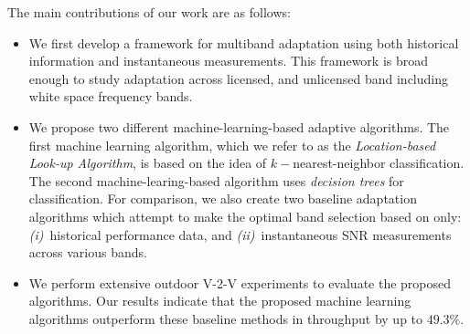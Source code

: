 The main contributions of our work are as follows:
\begin{itemize}
\item We first develop a framework for multiband adaptation using both historical information and instantaneous measurements. This framework is broad enough to study adaptation across licensed, and unlicensed band including white space frequency bands.  

\item We propose two different machine-learning-based adaptive algorithms. The 
first machine learning algorithm, which we refer to as the \emph{Location-based 
Look-up Algorithm}, 
is based on the idea of $k-$nearest-neighbor classification. The second machine-learing-based 
algorithm uses \emph{decision trees} for classification. 
For comparison, we also create two baseline adaptation algorithms which attempt to make the optimal band selection based on only: {\it (i)}~historical 
performance data, and {\it (ii)}~instantaneous SNR measurements across 
various bands. 

\item We perform extensive outdoor V-2-V experiments to evaluate the proposed algorithms.
Our results indicate that the proposed machine learning algorithms outperform 
these baseline methods in throughput by up to $49.3\%$.

\end{itemize}




